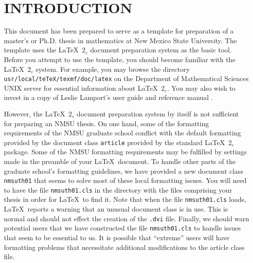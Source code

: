 \section{INTRODUCTION} \label{intro}
\hspace{\parindent}
This document has been prepared to serve as a template for preparation 
of a master's or Ph.D. thesis in mathematics at New Mexico State University.  
The template uses the \LaTeX\ $2_{\varepsilon}$  document preparation
system as the basic tool. Before you attempt to use the template, you
should become familiar with the \LaTeX\ $2_{\varepsilon}$ system.  
For example, you may browse the directory 
{\tt usr/local/teTeX/texmf/doc/latex} 
on the Department of Mathematical Sciences UNIX server for essential
information about \LaTeX\ $2_{\varepsilon}$.  You may also wish to
invest in a copy of Leslie Lamport's user guide and reference manual
\cite{Lamport}.

However, the \LaTeX\ $2_{\varepsilon}$ document preparation system by 
itself is not sufficient for preparing an NMSU thesis.  On one hand, 
some of the formatting requirements of the NMSU graduate school
conflict with the default formatting provided by the document class 
{\tt article} provided by the standard \LaTeX\ $2_{\varepsilon}$ package.
Some of the NMSU formatting requirements may be fulfilled by settings
made in the preamble of your \LaTeX\ document.  To handle other 
parts of the graduate school's formatting guidelines, 
we have provided a new document class {\tt nmsuth01} that
seems to solve most of these local formatting issues.  You will need to have 
the file {\tt nmsuth01.cls} in the directory with the files comprising 
your thesis in order for \LaTeX\ to find it.  Note that when the file 
{\tt nmsuth01.cls} loads, \LaTeX\ reports a warning that an unusual
document class is in use.  This is normal and should not effect the
creation of the {\tt .dvi} file.   Finally, we should warn potential
users that we have constructed the file {\tt nmsuth01.cls} to handle
issues that seem to be essential to us.  It is possible that
``extreme'' users will have formatting problems that necessitate
additional modifications to the article class file.

